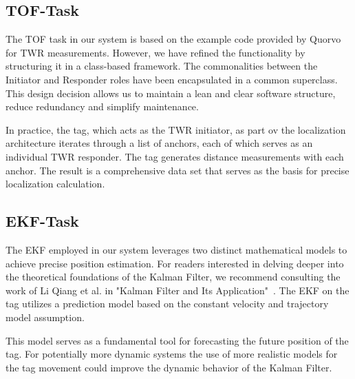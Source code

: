 \documentclass[conference, a4paper]{IEEEtran}
\begin{document}
\subsection{TOF-Task}\label{section:firmware-tof}
The \ac{TOF} task in our system is based on the example code
provided by Quorvo for \ac{TWR} measurements.
However, we have refined the functionality by structuring it in a class-based framework.
The commonalities between the Initiator and Responder roles have been
encapsulated in a common superclass.
This design decision allows us to maintain a lean and clear software structure,
reduce redundancy and simplify maintenance.

In practice, the tag, which acts as the \ac{TWR} initiator, as part ov the localization architecture iterates through a list of anchors, each of which serves as an individual \ac{TWR} responder. 
The tag generates distance measurements with each anchor. 
The result is a comprehensive data set that serves as the basis for precise localization calculation. 

\subsection{EKF-Task}\label{section:firmware-ekf}
The \ac{EKF} employed in our system leverages two distinct mathematical models
to achieve precise position estimation.
For readers interested in delving deeper into the theoretical foundations of the
Kalman Filter, we recommend consulting the work of Li Qiang et al. in
"Kalman Filter and Its Application"~\cite{Kalman}.
The EKF  on the tag utilizes a prediction model based on the constant velocity and trajectory model assumption.

This model serves as a fundamental tool for forecasting the future position of the tag.
For potentially more dynamic systems the use of more realistic models
for the tag movement could improve the dynamic behavior of the Kalman Filter.
\end{document}
